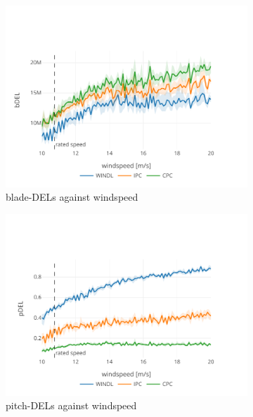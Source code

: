 \begin{figure}[hbt!]
  \centering
  \begin{subfigure}[b]{0.48\textwidth}
      \centering
      \includegraphics[width=\textwidth]{images/adjusted_bdelopt_bdel.pdf}
      \caption{blade-DELs against windspeed}
      \label{fig:adjusted-bdelopt-bdel}
  \end{subfigure}
  \begin{subfigure}[b]{0.48\textwidth}
      \centering
      \includegraphics[width=\textwidth]{images/adjusted_bdelopt_pdel.pdf}
      \caption{pitch-DELs against windspeed}
      \label{fig:adjusted-bdelopt-pdel}
  \end{subfigure}
  \begin{subfigure}[b]{0.48\textwidth}

\end{subfigure}
\end{figure}
